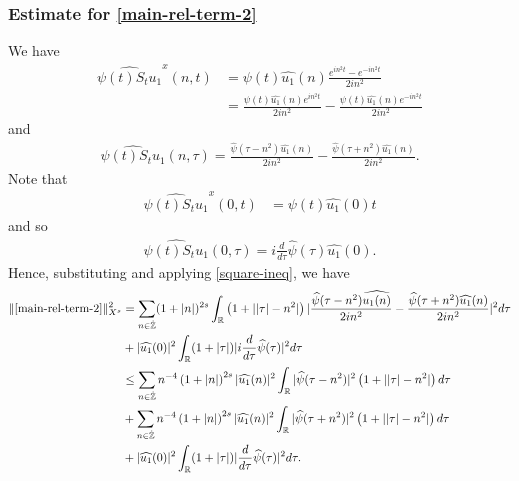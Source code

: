 \documentclass[12pt,reqno]{amsart}
\numberwithin{equation}{section}  %
\numberwithin{figure}{section}
\newcommand{\rr}{\mathbb{R}}
\newcommand{\zz}{\mathbb{Z}}
\newcommand{\zzdot}{\dot{\zz}}
\newcommand{\wh}{\widehat}
\theoremstyle{plain}
\theoremstyle{definition}
\theoremstyle{remark}
\begin{document}
\subsubsection{Estimate for \eqref{main-rel-term-2}}
\label{sssec:estimate-init-term-2}
We have
%
%
\begin{equation*}
  \begin{split}
    \wh{\psi(t)S_{t}u_{1}}^{x}(n, t)
    & = \psi(t) \wh{u_{1}}(n) \frac{e^{in^2 t} - e^{-in^{2}t}}{2i n^{2}}
    \\
    & = \frac{\psi(t) \wh{u_{1}}(n)e^{in^{2}t}}{2i n^{2}} - \frac{\psi(t)
    \wh{u_{1}}(n)e^{-in^{2}t}}{2i n^{2}}  
  \end{split}
\end{equation*}
%
%
and
%
%
\begin{equation*}
  \begin{split}
    \wh{\psi(t) S_{t}u_{1}}(n, \tau) = \frac{\wh{\psi}(\tau -
    n^{2})\wh{u_{1}}(n)}{2i n^{2}} - \frac{\wh{\psi}(\tau + n^{2})\wh{u_{1}}(n)}{2i
    n^{2}}.
  \end{split}
\end{equation*}
%
Note that 
%
\begin{equation*}
  \begin{split}
    \wh{\psi(t)S_{t}u_{1}}^{x}(0, t)
    & = \psi(t) \wh{u_{1}}(0) t
      \end{split}
\end{equation*}
and so 
%
%
\begin{equation*}
  \begin{split}
    \wh{\psi(t) S_{t}u_{1}}(0, \tau) = i \frac{d}{d \tau} \wh{\psi}(\tau)
    \wh{u_{1}}(0).
  \end{split}
\end{equation*}
%
Hence, substituting and applying \eqref{square-ineq}, we have
%
%
\begin{equation}
  \begin{split}
    \| \eqref{main-rel-term-2} \|_{X^{s}}^{2} 
    & = \sum_{n \in \zzdot}(1 + |n|)^{2s} \int_{\rr}\left( 1 + | | \tau
    |-n^{2} | \right) | \frac{\wh{\psi}(\tau - n^{2})\wh{u_{1}(n)}}{2i
    n^{2}} -
    \frac{\wh{\psi}(\tau + n^{2})\wh{u_{1}}(n)}{2i n^{2}} |^{2} d \tau
    \\
    & + |\wh{u_{1}}(0)|^{2} \int_{\rr} (1 + | \tau |) | i \frac{d }{d \tau}
    \wh{\psi}(\tau)|^{2} d \tau
    \\
    & \le \sum_{n \in \dot{\zz}} n^{-4} \left( 1 + |n| \right)^{2s} | \wh{u_{1}}(n)
    |^{2} \int_{\rr} | \wh{\psi}(\tau - n^{2}) |^{2}\left( 1 + | | \tau | -
    n^{2} | \right) d \tau
    \\
    & + \sum_{n \in \dot{\zz}} n^{-4} \left( 1 + |n| \right)^{2s} | \wh{u_{1}}(n)
    |^{2} \int_{\rr} | \wh{\psi}(\tau + n^{2}) |^{2}\left( 1 + | | \tau | -
    n^{2} | \right) d \tau
    \\
    & + |\wh{u_{1}}(0)|^{2} \int_{\rr} (1 + | \tau |) |\frac{d }{d \tau}
    \wh{\psi}(\tau)|^2 d \tau.
\end{split}
\label{u-1-norm-comp-pre}
\end{equation}
\end{document}
